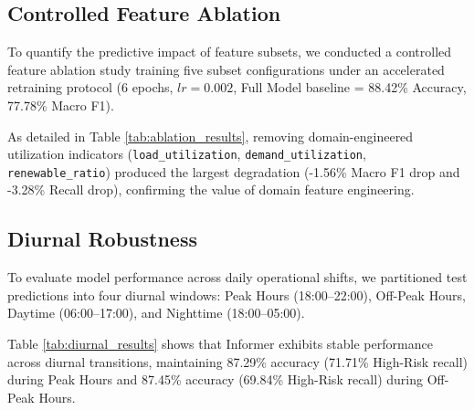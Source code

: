 \subsection{Controlled Feature Ablation}
To quantify the predictive impact of feature subsets, we conducted a controlled feature ablation study training five subset configurations under an accelerated retraining protocol (6 epochs, $lr = 0.002$, Full Model baseline = 88.42\% Accuracy, 77.78\% Macro F1).

As detailed in Table \ref{tab:ablation_results}, removing domain-engineered utilization indicators (\texttt{load\_utilization}, \texttt{demand\_utilization}, \texttt{renewable\_ratio}) produced the largest degradation (-1.56\% Macro F1 drop and -3.28\% Recall drop), confirming the value of domain feature engineering.

\begin{table}[htbp]
\caption{Controlled Ablation Study Performance Comparison}
\centering
{}
\label{tab:ablation_results}
\end{table}

\subsection{Diurnal Robustness}
To evaluate model performance across daily operational shifts, we partitioned test predictions into four diurnal windows: Peak Hours (18:00--22:00), Off-Peak Hours, Daytime (06:00--17:00), and Nighttime (18:00--05:00).

Table \ref{tab:diurnal_results} shows that Informer exhibits stable performance across diurnal transitions, maintaining 87.29\% accuracy (71.71\% High-Risk recall) during Peak Hours and 87.45\% accuracy (69.84\% High-Risk recall) during Off-Peak Hours.

